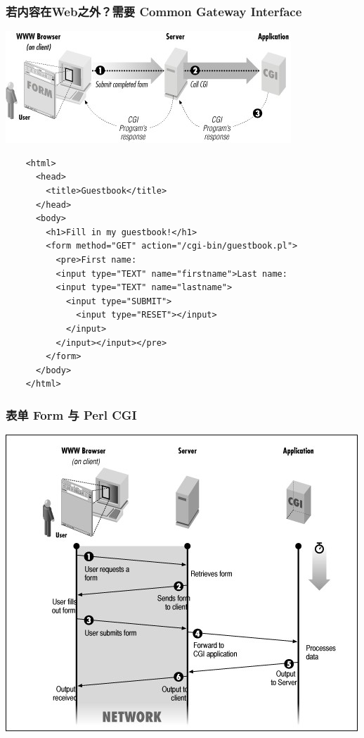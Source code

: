 \documentclass{beamer}
\begin{document}
\begin{frame}[fragile]
	\frametitle{若内容在Web之外？需要 Common Gateway Interface}
	\begin{center}
	\includegraphics[width=.5\textwidth]{images/typical-cgi-interaction.jpg}
	\end{center}
	\begin{tiny}
	\begin{verbatim}
	<html>
	  <head>
	    <title>Guestbook</title>
	  </head>
	  <body>
	    <h1>Fill in my guestbook!</h1>
	    <form method="GET" action="/cgi-bin/guestbook.pl">
	      <pre>First name: 
	      <input type="TEXT" name="firstname">Last name: 
	      <input type="TEXT" name="lastname">
	        <input type="SUBMIT">
	          <input type="RESET"></input>
	        </input>
	      </input></input></pre>
	    </form>
	  </body>
	</html>
	\end{verbatim}
	\end{tiny}
\end{frame}

\begin{frame}
	\frametitle{表单 Form 与 Perl CGI}
	\begin{center}
	\includegraphics[width=.7\textwidth]{images/cgi-detail.jpg}
	\end{center}
\end{frame}
\end{document}
